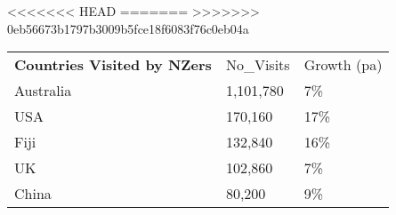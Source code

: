 <<<<<<< HEAD
=======
>>>>>>> 0eb56673b1797b3009b5fce18f6083f76c0eb04a
\begin{tabular}[t]{p{5cm}p{1.3cm}p{1.2cm}}
 \textbf{Countries Visited by NZers} & No\_Visits & Growth (pa) \\ 
 Australia & 1,101,780 & 7\% \\ 
  USA &   170,160 & 17\% \\ 
  Fiji &   132,840 & 16\% \\ 
  UK &   102,860 & 7\% \\ 
  China &    80,200 & 9\% \\ 
  \end{tabular}
